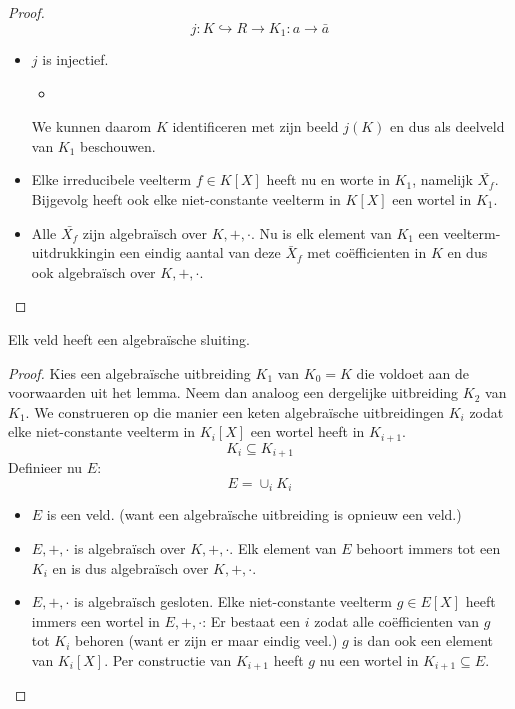 \documentclass[main.tex]{subfiles}
\begin{document}
\begin{lem}
\begin{proof}
    \[ j: K \hookrightarrow R \rightarrow K_{1}: a \rightarrow \bar{a} \]
    \begin{itemize}
    \item $j$ is injectief.
      \begin{itemize}
      \item 
      \end{itemize}
      We kunnen daarom $K$ identificeren met zijn beeld $j(K)$ en dus als deelveld van $K_{1}$ beschouwen.
    \item Elke irreducibele veelterm $f\in K[X]$ heeft nu en worte in $K_{1}$, namelijk $\bar{X_{f}}$.
      Bijgevolg heeft ook elke niet-constante veelterm in $K[X]$ een wortel in $K_{1}$.\waarom
    \item Alle $\bar{X_{f}}$ zijn algebra\"isch over $K,+,\cdot$.
      Nu is elk element van $K_{1}$ een veelterm-uitdrukkingin een eindig aantal van deze $\bar{X}_{f}$ met co\"efficienten in $K$ en dus ook algebra\"isch over $K,+,\cdot$.
    \end{itemize}
  \end{proof}
\end{lem}

\begin{st}
  Elk veld heeft een algebra\"ische sluiting.
  \begin{proof}
    Kies een algebra\"ische uitbreiding $K_{1}$ van $K_{0}=K$ die voldoet aan de voorwaarden uit het lemma.
    Neem dan analoog een dergelijke uitbreiding $K_{2}$ van $K_{1}$.
    We construeren op die manier een keten algebra\"ische uitbreidingen $K_{i}$ zodat elke niet-constante veelterm in $K_{i}[X]$ een wortel heeft in $K_{i+1}$.
    \[ K_{i} \subseteq K_{i+1} \]
    Definieer nu $E$:
    \[ E = \cup_{i}K_{i} \]
    \begin{itemize}
    \item $E$ is een veld. (want een algebra\"ische uitbreiding is opnieuw een veld.)
    \item $E,+,\cdot$ is algebra\"isch over $K,+,\cdot$.
      Elk element van $E$ behoort immers tot een $K_{i}$ en is dus algebra\"isch over $K,+,\cdot$.
    \item $E,+,\cdot$ is algebra\"isch gesloten.
      Elke niet-constante veelterm $g\in E[X]$ heeft immers een wortel in $E,+,\cdot$:
      Er bestaat een $i$ zodat alle co\"efficienten van $g$ tot $K_{i}$ behoren (want er zijn er maar eindig veel.)
      $g$ is dan ook een element van $K_{i}[X]$.
      Per constructie van $K_{i+1}$ heeft $g$ nu een wortel in $K_{i+1} \subseteq E$.
    \end{itemize}
  \end{proof}
\end{st}
\end{document}
